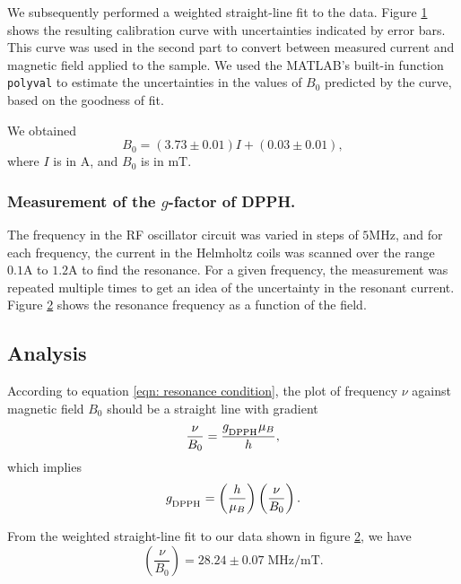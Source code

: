 \documentclass[a4paper]{jpconf}
\numberwithin{equation}{section}
\begin{document}
We subsequently performed a weighted straight-line fit to the data. Figure \ref{fig: HC calibration curve} shows the resulting calibration curve with uncertainties indicated by error bars. This curve was used in the second part to convert between measured current and magnetic field applied to the sample. We used the MATLAB's built-in function \texttt{polyval} to estimate the uncertainties in the values of $B_0$ predicted by the curve, based on the goodness of fit.

We obtained 
\[
	B_0 = (3.73 \pm 0.01) I + (0.03 \pm 0.01),
\]
where $I$ is in $\si{\ampere}$, and $B_0$ is in $\si{\milli\tesla}$.

\begin{figure}[htbp]
	\label{fig: HC calibration curve}
\end{figure}



\subsubsection{Measurement of the $g$-factor of DPPH.}
The frequency in the RF oscillator circuit was varied in steps of $5 \si{\mega\hertz}$, and for each frequency, the current in the Helmholtz coils was scanned over the range $0.1 \si{\ampere}$ to $1.2 \si{\ampere}$ to find the resonance. For a given frequency, the measurement was repeated multiple times to get an idea of the uncertainty in the resonant current. Figure \ref{fig: DPPH resonance} shows the resonance frequency as a function of the field.

\begin{figure}[htbp]
	\label{fig: DPPH resonance}
\end{figure}

\subsection{Analysis}
According to equation \eqref{eqn: resonance condition}, the plot of frequency $\nu$ against magnetic field $B_0$ should be a straight line with gradient 
\[
	\frac{\nu}{B_0} = \frac{g_{\textsubscript{DPPH}} \mu_B}{h},
\]
which implies
\begin{equation} \label{eqn: gradient}
	g_{\textsubscript{DPPH}} = \left(\frac{h}{\mu_B}\right) \left(\frac{\nu}{B_0}\right). 
\end{equation}
	
From the weighted straight-line fit to our data shown in figure \ref{fig: DPPH resonance}, we have
\[
	\left(\frac{\nu}{B_0}\right) = 28.24 \pm 0.07 \; \si{\mega\hertz\per\milli\tesla}.
\]
\end{document}
